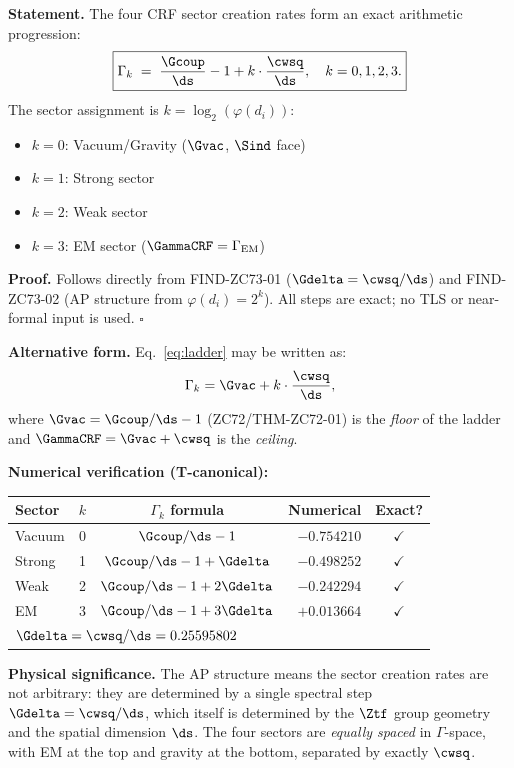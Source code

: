 \documentclass[12pt, a4paper]{article}
\begin{document}
\begin{formalbox}[title={THM-ZC73-01: $\Gamma$-Sector Ladder Theorem
  ($R_0$, Exact)}]
\textbf{Statement.}
The four CRF sector creation rates form an exact arithmetic progression:
\begin{equation}
  \boxed{
  \Gamma_k \;=\; \frac{\Gcoup}{\ds} - 1 + k\cdot\frac{\cwsq}{\ds},
  \quad k = 0,1,2,3.
  }
  \label{eq:ladder}
\end{equation}
The sector assignment is $k = \log_2(\varphi(d_i))$:
\begin{itemize}[leftmargin=2em, noitemsep]
  \item $k=0$: Vacuum/Gravity ($\Gvac$, $\Sind$ face)
  \item $k=1$: Strong sector
  \item $k=2$: Weak sector
  \item $k=3$: EM sector ($\GammaCRF = \Gamma_{\rm EM}$)
\end{itemize}

\textbf{Proof.}
Follows directly from FIND-ZC73-01 ($\Gdelta = \cwsq/\ds$)
and FIND-ZC73-02 (AP structure from $\varphi(d_i) = 2^k$).
All steps are exact; no TLS or near-formal input is used.
\hfill$\square$

\textbf{Alternative form.}
Eq.~\eqref{eq:ladder} may be written as:
\[
  \Gamma_k = \Gvac + k\cdot\frac{\cwsq}{\ds},
\]
where $\Gvac = \Gcoup/\ds - 1$ (ZC72/THM-ZC72-01) is the
\emph{floor} of the ladder and $\GammaCRF = \Gvac + \cwsq$
is the \emph{ceiling}.

\textbf{Numerical verification (T-canonical):}
\begin{center}
{\small\renewcommand{\arraystretch}{1.25}
\begin{tabular}{@{}lccrc@{}}
\toprule
Sector & $k$ & $\Gamma_k$ formula & Numerical & Exact? \\
\midrule
Vacuum  & 0 & $\Gcoup/\ds-1$       & $-0.754210$ & $\checkmark$ \\
Strong  & 1 & $\Gcoup/\ds-1+\Gdelta$   & $-0.498252$ & $\checkmark$ \\
Weak    & 2 & $\Gcoup/\ds-1+2\Gdelta$  & $-0.242294$ & $\checkmark$ \\
EM      & 3 & $\Gcoup/\ds-1+3\Gdelta$  & $+0.013664$ & $\checkmark$ \\
\midrule
\multicolumn{3}{l}{$\Gdelta = \cwsq/\ds = 0.25595802$}
  & & \\
\bottomrule
\end{tabular}
}
\end{center}

\textbf{Physical significance.}
The AP structure means the sector creation rates are not
arbitrary: they are determined by a single spectral step
$\Gdelta = \cwsq/\ds$, which itself is determined by the
$\Ztf$ group geometry and the spatial dimension $\ds$.
The four sectors are \emph{equally spaced} in $\Gamma$-space,
with EM at the top and gravity at the bottom, separated by
exactly $\cwsq$.
\end{formalbox}
\end{document}
